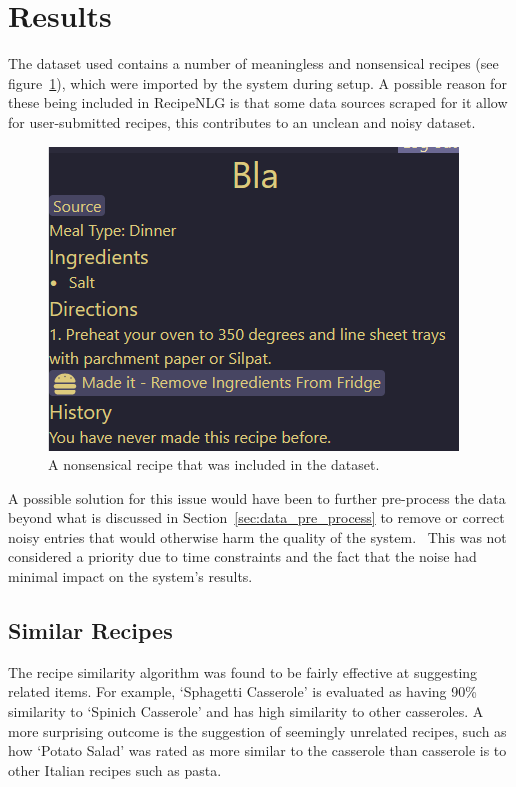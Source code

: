 
\section{Results}

The dataset used contains a number of meaningless and nonsensical recipes (see
figure~\ref{fig:bad_recipe_entry}), which were imported by the \chef{} system during setup.
A possible reason for these being included in RecipeNLG is that some
data sources scraped for it allow for user-submitted recipes, this contributes to
an unclean and noisy dataset.~\cite{kicherer_what_2018}

\begin{figure}[p]
    \centering
    \caption{\label{fig:bad_recipe_entry}A nonsensical recipe that was included in the dataset.}
    \includegraphics[scale=0.75]{figures/bad_recipe_entry.png}
\end{figure}

A possible solution for this issue would have been to further pre-process the data beyond what is
discussed in Section~\ref{sec:data_pre_process} to remove or correct noisy entries that would otherwise
harm the quality of the system.~\cite{garcia_big_2016} This was not considered a priority due to time
constraints and the fact that the noise had minimal impact on the system's results.

\subsection{Similar Recipes}

The recipe similarity algorithm was found to be fairly effective at suggesting related items.
For example, \enquote*{Sphagetti Casserole} is evaluated as having 90\% similarity to
\enquote*{Spinich Casserole} and has high similarity to other casseroles. A more surprising
outcome is the suggestion of seemingly unrelated recipes, such as how \enquote*{Potato Salad}
was rated as more similar to the casserole than casserole is to other Italian recipes such as
pasta.

